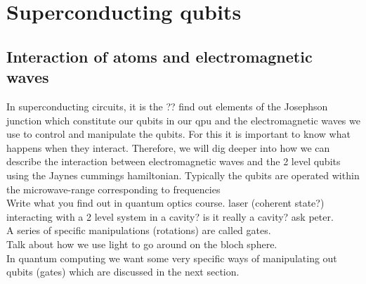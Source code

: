 \chapter{Superconducting qubits}\label{chap:Super_conducting_qubits}



\section{Interaction of atoms and electromagnetic waves}
    In superconducting circuits, it is the ?? find out elements of the Josephson junction which constitute our qubits in our \acrshort{qpu} and the electromagnetic waves we use to control and manipulate the qubits. For this it is important to know what happens when they interact. Therefore, we will dig deeper into how we can describe the interaction between electromagnetic waves and the 2 level qubits using the Jaynes cummings hamiltonian. Typically the qubits are operated within the microwave-range corresponding to frequencies 
    \\
    Write what you find out in quantum optics course. 
        laser (coherent state?) interacting with a 2 level system in a cavity? is it really a cavity? ask peter. 
    \\
    A series of specific manipulations (rotations) are called gates. 
    \\
    Talk about how we use light to go around on the bloch sphere. 
    \\
    In quantum computing we want some very specific ways of manipulating out qubits (gates) which are discussed in the next section.
    
        
